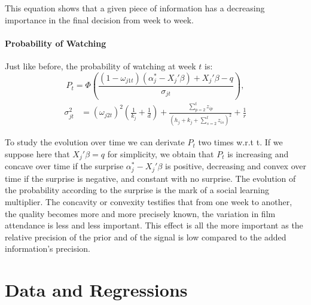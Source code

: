 \documentclass{article}
\begin{document}
This equation shows that a given piece of information has a decreasing importance in the final decision from week to week.\\

\paragraph{Probability of Watching}
Just like before, the probability of watching at week $t$ is:
\begin{equation}	
P_{t}=\Phi\left(\frac{(1-\omega_{j 1 t})(\alpha_{j}^{*}-X_{j}'\beta)+X_{j}'\beta-q}{\sigma_{j t}}\right),
\end{equation}
\begin{align*}
\sigma_{j t}^{2}
&=(\omega_{j 2 t })^{2}\left(\frac{1}{k_{j}}+\frac{1}{d}\right)+\frac{\sum_{p=2}^{t}z_{i p}}{(h_{j}+k_{j}+\sum_{s=2}^{t}z_{i s})^{2}}+\frac{1}{r}
\end{align*}

To study the evolution over time we can derivate $P_{t}$ two times w.r.t t. If we suppose here that $X_{j}'\beta=q$ for simplicity, we obtain that $P_{t}$ is increasing and concave over time if the surprise $\alpha_{j}^{*}-X_{j}'\beta$ is positive, decreasing and convex over time if the surprise is negative, and constant with no surprise. The evolution of the probability according to the surprise is the mark of a social learning multiplier. The concavity or convexity testifies that from one week to another, the quality becomes more and more precisely known, the variation in film attendance is less and less important. This effect is all the more important as the relative precision of the prior and of the signal is low compared to the added information's precision.\\

%

\section{Data and Regressions}
\end{document}
